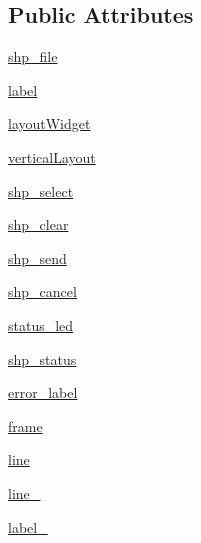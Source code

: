 \subsection*{Public Attributes}
\begin{DoxyCompactItemize}
\item 
\hyperlink{classsrc_1_1client_1_1gui_1_1send__shp_1_1Ui__SendSHP_a2be97e97d25b25823041206cd5724103}{shp\_\-file}
\item 
\hyperlink{classsrc_1_1client_1_1gui_1_1send__shp_1_1Ui__SendSHP_a2f70e1325cb32b4a1e55a35a7398227e}{label}
\item 
\hyperlink{classsrc_1_1client_1_1gui_1_1send__shp_1_1Ui__SendSHP_ab259adb6780f4427bab757cedd4e78af}{layoutWidget}
\item 
\hyperlink{classsrc_1_1client_1_1gui_1_1send__shp_1_1Ui__SendSHP_affb18739a56e04a5404304ab7f6e7b00}{verticalLayout}
\item 
\hyperlink{classsrc_1_1client_1_1gui_1_1send__shp_1_1Ui__SendSHP_a85c6c95607c2ef9231c12ee979b56eb2}{shp\_\-select}
\item 
\hyperlink{classsrc_1_1client_1_1gui_1_1send__shp_1_1Ui__SendSHP_ade4eb7ada570f6f5b35218ef8d3f473a}{shp\_\-clear}
\item 
\hyperlink{classsrc_1_1client_1_1gui_1_1send__shp_1_1Ui__SendSHP_a8f5d3f36b1699055fd42b3376ae9c310}{shp\_\-send}
\item 
\hyperlink{classsrc_1_1client_1_1gui_1_1send__shp_1_1Ui__SendSHP_a65ea120b1f418bee1ad9f88e07adc41e}{shp\_\-cancel}
\item 
\hyperlink{classsrc_1_1client_1_1gui_1_1send__shp_1_1Ui__SendSHP_a79d5e2d010b9cc5235ff9e6ce7392203}{status\_\-led}
\item 
\hyperlink{classsrc_1_1client_1_1gui_1_1send__shp_1_1Ui__SendSHP_af1a9a738943641807376e0d975a205d4}{shp\_\-status}
\item 
\hyperlink{classsrc_1_1client_1_1gui_1_1send__shp_1_1Ui__SendSHP_a309b9edc77ea9f438140e342e01f96ae}{error\_\-label}
\item 
\hyperlink{classsrc_1_1client_1_1gui_1_1send__shp_1_1Ui__SendSHP_a05d1d88e545ddc070280b222b969555f}{frame}
\item 
\hyperlink{classsrc_1_1client_1_1gui_1_1send__shp_1_1Ui__SendSHP_a36a70d9d4c3fdb39365f9af729a5ffcf}{line}
\item 
\hyperlink{classsrc_1_1client_1_1gui_1_1send__shp_1_1Ui__SendSHP_a32e5c0a1ae5d5e55b94193add2a21208}{line\_}
\item 
\hyperlink{classsrc_1_1client_1_1gui_1_1send__shp_1_1Ui__SendSHP_a47bc3ce89154681032e97ab664508755}{label\_}

\end{DoxyCompactItemize}
